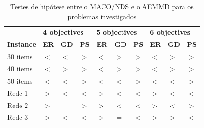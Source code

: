\begin{table}[htb]
	\centering
	\def\arraystretch{1.0}
	\caption{Testes de hipótese entre o MACO/NDS e o AEMMD para os problemas investigados}
	\label{tab_ztest_meams}
	\begin{tabular}{llllllllll}
		& \multicolumn{3}{l}{\textbf{4 objectives}} & \multicolumn{3}{l}{\textbf{5 objectives}} & \multicolumn{3}{l}{\textbf{6 objectives
		}} \\
		\textbf{Instance} & \textbf{ER} & \textbf{GD} & \textbf{PS} & \textbf{ER} & \textbf{GD} & \textbf{PS} & \textbf{ER} & \textbf{GD} & \textbf{PS} \\ \hline
		30 items & \cellcolor{table-green} $<$ & \cellcolor{table-green} $<$ & \cellcolor{table-green} $>$ & \cellcolor{table-green} $<$ & \cellcolor{table-red} $>$ & \cellcolor{table-green} $>$ & \cellcolor{table-green} $<$ & \cellcolor{table-red} $>$ & \cellcolor{table-green} $>$ \\
		40 items & \cellcolor{table-green} $<$ & \cellcolor{table-red} $>$ & \cellcolor{table-green} $>$ & \cellcolor{table-green} $<$ & \cellcolor{table-red} $>$ & \cellcolor{table-green} $>$ & \cellcolor{table-green} $<$ & \cellcolor{table-red} $>$ & \cellcolor{table-green} $>$ \\
		50 items & \cellcolor{table-green} $<$ & \cellcolor{table-green} $<$ & \cellcolor{table-green} $>$ & \cellcolor{table-green} $<$ & \cellcolor{table-green} $<$ & \cellcolor{table-green} $>$ & \cellcolor{table-green} $<$ & \cellcolor{table-green} $<$ & \cellcolor{table-green} $>$ \\  \hline 
		Rede 1 & \cellcolor{table-red} $>$ & \cellcolor{table-green} $<$ & \cellcolor{table-red} $<$ & \cellcolor{table-red} $>$ & \cellcolor{table-green} $<$ & \cellcolor{table-red} $<$ & \cellcolor{table-red} $>$ & \cellcolor{table-green} $<$ & \cellcolor{table-red} $<$ \\
		Rede 2 & \cellcolor{table-red} $>$ & \cellcolor{white} $=$ & \cellcolor{table-green} $>$ & \cellcolor{table-red} $>$ & \cellcolor{table-green} $<$ & \cellcolor{table-red} $<$ & \cellcolor{table-red} $>$ & \cellcolor{table-green} $<$ & \cellcolor{table-green} $>$ \\
		Rede 3 & \cellcolor{table-red} $>$ & \cellcolor{table-green} $<$ & \cellcolor{table-red} $<$ & \cellcolor{table-red} $>$ & \cellcolor{white} $=$ & \cellcolor{table-red} $<$ & \cellcolor{table-red} $>$ & \cellcolor{table-red} $>$ & \cellcolor{table-red} $<$ \\  \hline 
	\end{tabular}
\end{table}

